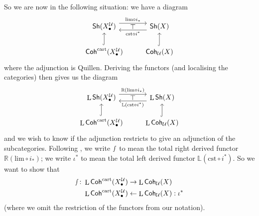 \documentclass[11pt,fleqn]{article}
\theoremstyle{plain}
\theoremstyle{definition}
\theoremstyle{remark}
\numberwithin{equation}{theorem}
\newcommand{\cover}{\mathcal{U}}
\newcommand{\cst}{\mathrm{cst}}
\newcommand{\gshX}{\mathsf{Sh}(X)}
\newcommand{\gcohUX}{\mathsf{Coh}_{\cover}(X)}
\newcommand{\shX}{\mathsf{Sh}(\nerve{\bullet})}
\newcommand{\cartcohX}{\mathsf{Coh}^\mathrm{cart}(X_\bullet^\cover)}
\newcommand{\nerve}[1]{X_{#1}^\cover}
\DeclareMathOperator{\LL}{L}
\begin{document}
        So we are now in the following situation: we have a diagram
        \begin{equation*}
            \begin{tikzcd}
                \shX
                    \ar[r,shift left=2,"\mathrm{lim}\circ i_*"{name=U}]
                & \gshX
                    \ar[l,shift left=2,"\cst\circ i^*"{name=D}]\\
                \cartcohX
                    \ar[u,hook]
                & \gcohUX
                    \ar[u,hook]
                \ar[from=U,to=D,phantom,"\top"]
            \end{tikzcd}
        \end{equation*}
        where the adjunction is Quillen.
        Deriving the functors (and localising the categories) then gives us the diagram
        \begin{equation*}
            \begin{tikzcd}
                \LL{\shX}
                    \ar[r,shift left=2,"\mathbb{R}(\mathrm{lim}\circ i_*)"{name=U}]
                & \LL{\gshX}
                    \ar[l,shift left=2,"\mathbb{L}(\cst\circ i^*)"{name=D}]\\
                \LL{\cartcohX}
                    \ar[u,hook]
                & \LL{\gcohUX}
                    \ar[u,hook]
                \ar[from=U,to=D,phantom,"\top"]
            \end{tikzcd}
        \end{equation*}
        and we wish to know if the adjunction restricts to give an adjunction of the subcategories.
        Following \cite[Lemma~2.2.2.13]{Toen&Vezzosi2008}, we write $\smallint$ to mean the total right derived functor $\mathbb{R}(\mathrm{lim}\circ i_*)$; we write $\iota^*$ to mean the total left derived functor $\mathbb{L}(\cst\circ i^*)$.
        So we want to show that
        \begin{align*}
            \smallint \colon \LL{\cartcohX} &\to \LL{\gcohUX}\\
            \LL{\cartcohX} &\leftarrow \LL{\gcohUX} : \iota^*
        \end{align*}
        (where we omit the restriction of the functors from our notation).
\end{document}
